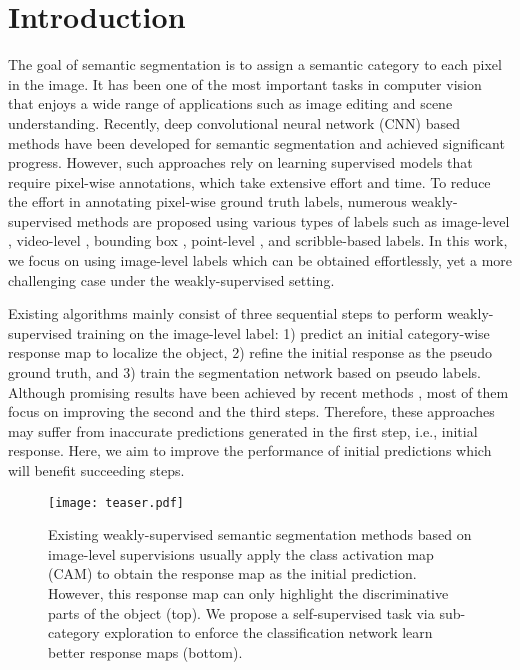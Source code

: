 \documentclass[10pt,twocolumn,letterpaper]{article}
\begin{document}
\section{Introduction}
The goal of semantic segmentation is to assign a semantic category to each pixel in the image. It has been one of the most important tasks in computer vision that enjoys a wide range of applications such as image editing and scene understanding. 
Recently, deep convolutional neural network (CNN) based methods \cite{fcn_pami,deeplab,dilated} have been developed for semantic segmentation and achieved significant progress.
However, such approaches rely on learning supervised models that require pixel-wise annotations, which take extensive effort and time.  
To reduce the effort in annotating pixel-wise ground truth labels, numerous weakly-supervised methods are proposed using various types of labels such as image-level \cite{ahn2018learning,kolesnikov2016seed,pathak2015constrained,pinheiro2015image}, video-level \cite{Chen_IJCV_2020,Zhong_ACCV_2016,Tsai_ECCV_2016}, bounding box \cite{papandreou2015weakly,dai2015boxsup,khoreva_CVPR17}, point-level \cite{Bearman_ECCV16}, and scribble-based \cite{lin2016scribblesup,Vernaza_CVPR17} labels.
In this work, we focus on using image-level labels which can be obtained effortlessly, yet a more challenging case under the weakly-supervised setting.


Existing algorithms mainly consist of three sequential steps to perform weakly-supervised training on the image-level label: 1) predict an initial category-wise response map to localize the object, 2) refine the initial response as the pseudo ground truth, and 3) train the segmentation network based on pseudo labels.
Although promising results have been achieved by recent methods \cite{ahn2018learning,huang2018weakly,wang2018weakly,wei2018revisiting}, most of them focus on improving the second and the third steps. Therefore, these approaches may suffer from inaccurate predictions generated in the first step, i.e., initial response.
Here, we aim to improve the performance of initial predictions which will benefit succeeding steps.


\begin{figure}[t]
	\centering
	\texttt{[image: teaser.pdf]}\\
\caption{Existing weakly-supervised semantic segmentation methods based on image-level supervisions usually apply the class activation map (CAM) to obtain the response map as the initial prediction. 
However, this response map can only highlight the discriminative parts of the object (top). 
We propose a self-supervised task via sub-category exploration to enforce the classification network learn better response maps (bottom).
	}
	\label{fig:teaser}
 	\vspace{-3mm}
\end{figure}
\end{document}
